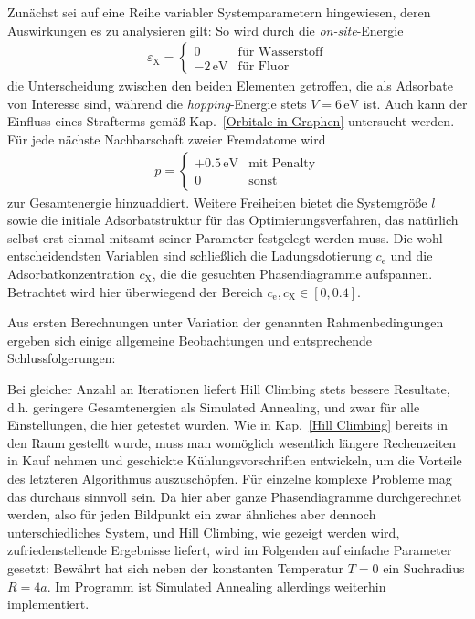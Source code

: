 \documentclass[a4paper, 10pt, twoside, openany]{book} %
\def \eX {\varepsilon_\mathrm{X}}
\def \cE {c_\mathrm{e}}
\def \cX {c_\mathrm{X}}
\begin{document}
Zunächst sei auf eine Reihe variabler Systemparametern hingewiesen, deren Auswirkungen es zu analysieren gilt: So wird durch die \emph{on-site}-Energie
%
\begin{align*}
    \eX = \begin{cases} 0 & \text{für Wasserstoff} \\ -2\,\mathrm{eV} & \text{für Fluor} \end{cases}
\end{align*}
%
die Unterscheidung zwischen den beiden Elementen getroffen, die als Adsorbate von Interesse sind, während die \emph{hopping}-Energie stets $V = 6\,\mathrm{eV}$ ist. Auch kann der Einfluss eines Strafterms gemäß Kap.~\ref{Orbitale in Graphen} untersucht werden. Für jede nächste Nachbarschaft zweier Fremdatome wird
%
\begin{align*}
    p = \begin{cases} +0.5\,\mathrm{eV} & \text{mit Penalty} \\ 0 & \text{sonst} \end{cases}
\end{align*}
%
zur Gesamtenergie hinzuaddiert. Weitere Freiheiten bietet die Systemgröße $l$ sowie die initiale Adsorbatstruktur für das Optimierungsverfahren, das natürlich selbst erst einmal mitsamt seiner Parameter festgelegt werden muss. Die wohl entscheidendsten Variablen sind schließlich die Ladungsdotierung $\cE$ und die Adsorbatkonzentration $\cX$, die die gesuchten Phasendiagramme aufspannen. Betrachtet wird hier überwiegend der Bereich $\cE, \cX \in [0, 0.4]$.

Aus ersten Berechnungen unter Variation der genannten Rahmenbedingungen ergeben sich einige allgemeine Beobachtungen und entsprechende Schlussfolgerungen:

Bei gleicher Anzahl an Iterationen liefert Hill Climbing stets bessere Resultate, d.h. geringere Gesamtenergien als Simulated Annealing, und zwar für alle Einstellungen, die hier getestet wurden. Wie in Kap.~\ref{Hill Climbing} bereits in den Raum gestellt wurde, muss man womöglich wesentlich längere Rechenzeiten in Kauf nehmen und geschickte Kühlungsvorschriften entwickeln, um die Vorteile des letzteren Algorithmus auszuschöpfen. Für einzelne komplexe Probleme mag das durchaus sinnvoll sein. Da hier aber ganze Phasendiagramme durchgerechnet werden, also für jeden Bildpunkt ein zwar ähnliches aber dennoch unterschiedliches System, und Hill Climbing, wie gezeigt werden wird, zufriedenstellende Ergebnisse liefert, wird im Folgenden auf einfache Parameter gesetzt: Bewährt hat sich neben der konstanten Temperatur $T = 0$ ein Suchradius $R = 4 a$. Im Programm ist Simulated Annealing allerdings weiterhin implementiert.
\end{document}

